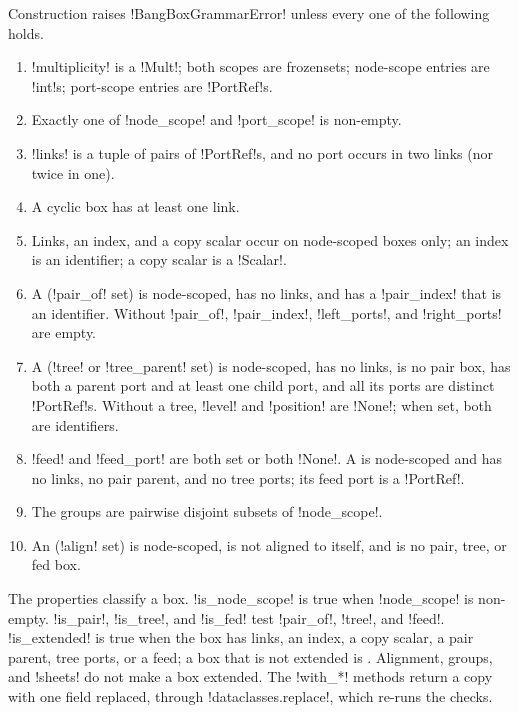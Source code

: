 \begin{definition}\label{def:diagrams-box-invariants}
Construction raises \py!BangBoxGrammarError! unless every one of the following holds.
\begin{enumerate}
\item \py!multiplicity! is a \py!Mult!; both scopes are frozensets; node-scope entries are \py!int!s; port-scope entries are \py!PortRef!s.
\item Exactly one of \py!node_scope! and \py!port_scope! is non-empty.
\item \py!links! is a tuple of pairs of \py!PortRef!s, and no port occurs in two links (nor twice in one).
\item A cyclic box has at least one link.
\item Links, an index, and a copy scalar occur on node-scoped boxes only; an index is an identifier; a copy scalar is a \py!Scalar!.
\item A  (\py!pair_of! set) is node-scoped, has no links, and has a \py!pair_index! that is an identifier. Without \py!pair_of!, \py!pair_index!, \py!left_ports!, and \py!right_ports! are empty.
\item A  (\py!tree! or \py!tree_parent! set) is node-scoped, has no links, is no pair box, has both a parent port and at least one child port, and all its ports are distinct \py!PortRef!s. Without a tree, \py!level! and \py!position! are \py!None!; when set, both are identifiers.
\item \py!feed! and \py!feed_port! are both set or both \py!None!. A  is node-scoped and has no links, no pair parent, and no tree ports; its feed port is a \py!PortRef!.
\item The groups are pairwise disjoint subsets of \py!node_scope!.
\item An  (\py!align! set) is node-scoped, is not aligned to itself, and is no pair, tree, or fed box.
\end{enumerate}
\end{definition}

The properties classify a box. \py!is_node_scope! is true when \py!node_scope! is non-empty. \py!is_pair!, \py!is_tree!, and \py!is_fed! test \py!pair_of!, \py!tree!, and \py!feed!. \py!is_extended! is true when the box has links, an index, a copy scalar, a pair parent, tree ports, or a feed; a box that is not extended is . Alignment, groups, and \py!sheets! do not make a box extended. The \py!with_*! methods return a copy with one field replaced, through \py!dataclasses.replace!, which re-runs the checks.

